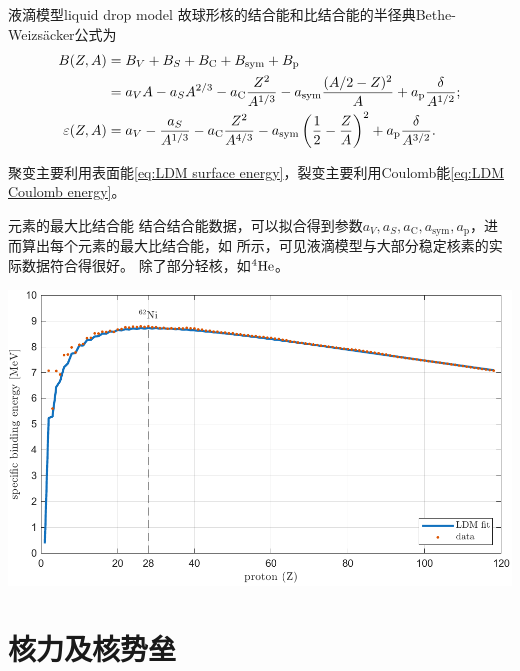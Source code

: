 \begin{theorem}{液滴模型}{liquid drop model}
	故球形核的结合能和比结合能的半径典Bethe-Weizs\"acker公式为
	\begin{subequations}
		\begin{align}
			\notag
			B(Z,A)&=B_V+B_S+B_\mathrm C+B_\mathrm{sym}+B_\mathrm p\\
			\label{liquid-drop model BE}
			&=a_VA-a_SA^{2/3}-a_\mathrm C\frac{Z^2}{A^{1/3}}-a_\mathrm{sym}\frac{(A/2-Z)^2}{A}+a_\mathrm p\frac{\delta}{A^{1/2}};\\
			\label{liquid-drop model SBE}
			\varepsilon(Z,A)&=a_V-\frac{a_S}{A^{1/3}}-a_\mathrm C\frac{Z^2}{A^{4/3}}-a_\mathrm{sym}\left(\frac12-\frac ZA\right)^2+a_\mathrm p\frac{\delta}{A^{3/2}}.
		\end{align}
	\end{subequations}
\end{theorem}

\begin{corollary}
	聚变主要利用表面能\eqref{eq:LDM surface energy}，裂变主要利用Coulomb能\eqref{eq:LDM Coulomb energy}。
\end{corollary}

\begin{example}
	{元素的最大比结合能}{}
	结合结合能数据，可以拟合得到参数$a_V,a_S,a_\mathrm C,a_\mathrm{sym},a_\mathrm p$，进而算出每个元素的最大比结合能，如 所示，可见液滴模型与大部分稳定核素的实际数据符合得很好。
	除了部分轻核，如${^{4}\mathrm{He}}$。
	\begin{center}
		\includegraphics[width=0.9\linewidth]{figures/binding_energy.pdf}
		\label{fig:binding energy}
	\end{center}
\end{example}

\section{核力及核势垒}


